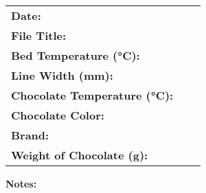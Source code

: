 \pagestyle{fancy}
\fancyhf{}

\titleformat{\section}{\normalfont\Large\bfseries}{}{0pt}{}

\renewcommand{\arraystretch}{1.4}  %


\noindent
\begin{tabularx}{\textwidth}{>{\bfseries}l X p{3cm}}
Date: & \hrulefill & \hrulefill \\
File Title: & \hrulefill & \hrulefill \\
Bed Temperature (°C): & \hrulefill  & \hrulefill \\
Line Width (mm): & \hrulefill  & \hrulefill \\
Chocolate Temperature (°C): & \hrulefill  & \hrulefill \\
Chocolate Color: & \hrulefill  & \hrulefill \\
Brand: & \hrulefill & \hrulefill \\
Weight of Chocolate (g): & \hrulefill & \hrulefill \\
\end{tabularx}


\noindent\textbf{Notes:}


\fbox{%
  \parbox[t][18cm][t]{\textwidth}{%
    \vspace{0.3cm} %
    \hspace{0.3cm} %
    \\
  }%
}


